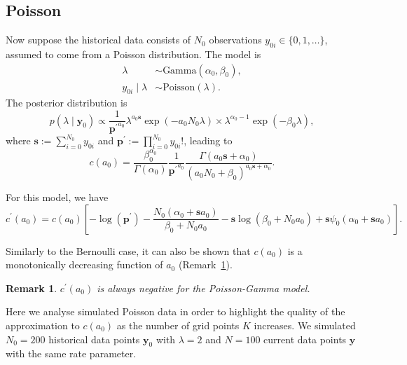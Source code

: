 \documentclass[a4paper, notitlepage, 11pt]{article}
\newtheorem{remark}{Remark}[]
\begin{document}
\subsection{Poisson}
\label{sec:poisson_illustration}
Now suppose the historical data consists of $N_0$ observations $y_{0i} \in \{0, 1, \ldots \}$, assumed to come from a Poisson distribution.
The model is 
\begin{align*}
 \lambda &\sim \text{Gamma}(\alpha_0, \beta_0),\\
 y_{0i} \mid \lambda &\sim \text{Poisson}(\lambda).
\end{align*}
The posterior distribution is 
\begin{equation}
 p(\lambda \mid \boldsymbol y_0) \propto \frac{1}{\boldsymbol {p^\prime}^{a_0} } \lambda^{a_0\boldsymbol s} \exp(-a_0 N_0 \lambda) \times \lambda^{\alpha_0-1} \exp(-\beta_0\lambda),
\end{equation}
where $\boldsymbol s := \sum_{i=0}^{N_0} y_{0i}$ and $\boldsymbol p^\prime := \prod_{i = 0}^{N_0} y_{0i}!$, leading to
\begin{equation}
 \label{eq:cA0_poisson}
 c(a_0) = \frac{\beta_0^{\alpha_0}}{\Gamma(\alpha_0)}\frac{1}{\boldsymbol {p^\prime}^{a_0} } \frac{\Gamma(a_0\boldsymbol s + \alpha_0)}{\left( a_0N_0 + \beta_0 \right)^{a_0\boldsymbol s + \alpha_0} }.
\end{equation}

For this model, we have
\begin{equation}
 \label{eq:cA0_prime_poisson}
 c^\prime(a_0) = c(a_0) \left[ -\log(\boldsymbol p^\prime) - \frac{N_0 (\alpha_0 + \boldsymbol s a_0) }{\beta_0 + N_0a_0} - \boldsymbol s \log(\beta_0 + N_0a_0) + \boldsymbol s \psi_0(\alpha_0 + \boldsymbol s a_0) \right].
\end{equation}

Similarly to the Bernoulli case, it can also be shown that $c(a_0)$ is a monotonically decreasing function of $a_0$ (Remark~\ref{rmk:poisson_c_prime}).
\begin{remark}
\label{rmk:poisson_c_prime}
$c^\prime(a_0)$ is always negative for the Poisson-Gamma model.
\end{remark}

Here we analyse simulated Poisson data in order to highlight the quality of the approximation to $c(a_0)$ as the number of grid points $K$ increases.
We simulated $N_0 = 200$ historical data points $\boldsymbol y_0$ with $\lambda = 2$ and $N = 100$ current data points $\boldsymbol y$ with the same rate parameter.
\end{document}
